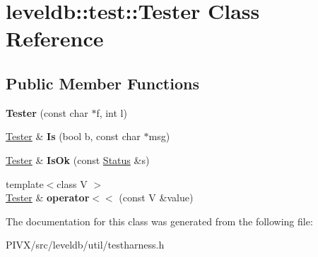 \hypertarget{classleveldb_1_1test_1_1_tester}{}\section{leveldb\+:\+:test\+:\+:Tester Class Reference}
\label{classleveldb_1_1test_1_1_tester}
\subsection*{Public Member Functions}
\begin{DoxyCompactItemize}
\item 
\mbox{\label{classleveldb_1_1test_1_1_tester_a166bc7b18483780292a44425ef5e64f7}} 
{\bfseries Tester} (const char $\ast$f, int l)
\item 
\mbox{\label{classleveldb_1_1test_1_1_tester_ad75cd5ea132083b72e7fd7271ef1918a}} 
\mbox{\hyperlink{classleveldb_1_1test_1_1_tester}{Tester}} \& {\bfseries Is} (bool b, const char $\ast$msg)
\item 
\mbox{\label{classleveldb_1_1test_1_1_tester_af0e4decc6f483a78af44926634d990c2}} 
\mbox{\hyperlink{classleveldb_1_1test_1_1_tester}{Tester}} \& {\bfseries Is\+Ok} (const \mbox{\hyperlink{classleveldb_1_1_status}{Status}} \&s)
\item 
\mbox{\label{classleveldb_1_1test_1_1_tester_a4e776d487df19ac9daeed5527cd1d80e}} 
{\footnotesize template$<$class V $>$ }\\\mbox{\hyperlink{classleveldb_1_1test_1_1_tester}{Tester}} \& {\bfseries operator$<$$<$} (const V \&value)
\end{DoxyCompactItemize}


The documentation for this class was generated from the following file\+:\begin{DoxyCompactItemize}
\item 
P\+I\+V\+X/src/leveldb/util/testharness.\+h\end{DoxyCompactItemize}
